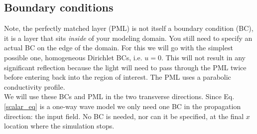 \documentclass[]{article}
\begin{document}
	\subsection{Boundary conditions}
	\label{BC_section}	
	Note, the perfectly matched layer (PML) is not itself a boundary condition (BC), it is a layer that sits \textit{inside} of your modeling domain. You still need to specify an actual BC on the edge of the domain. For this we will go with the simplest possible one, homogeneous Dirichlet BCs, i.e. $u=0$. This will not result in any significant reflection because the light will need to pass through the PML twice before entering back into the region of interest. The PML uses a parabolic conductivity profile.\\
	
	We will use these BCs and PML in the two transverse directions. Since Eq. \eqref{scalar_eq} is a one-way wave model we only need one BC in the propagation direction: the input field. No BC is needed, nor can it be specified, at the final $x$ location where the simulation stops.\\
	
\end{document}
